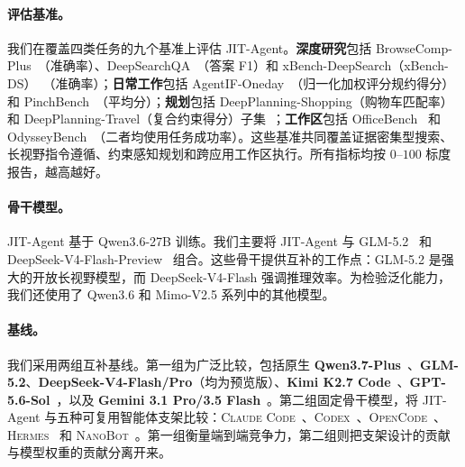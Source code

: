 \documentclass{article}
\newcommand{\ourmethod}{JIT-Agent\xspace}
\begin{document}
\paragraph{评估基准。}
我们在覆盖四类任务的九个基准上评估 \ourmethod。\textbf{深度研究}包括 BrowseComp-Plus~\citep{chen2025browsecompplusfairtransparentevaluation}（准确率）、DeepSearchQA~\citep{gupta2026deepsearchqabridgingcomprehensivenessgap}（答案 F1）和 xBench-DeepSearch（xBench-DS）~\citep{chen2025xbenchtrackingagentsproductivity}（准确率）；\textbf{日常工作}包括 AgentIF-Oneday~\citep{chen2026agentifonedaytasklevelinstructionfollowingbenchmark}（归一化加权评分规约得分）和 PinchBench~\citep{pinchbenchBestModels}（平均分）；\textbf{规划}包括 DeepPlanning-Shopping（购物车匹配率）和 DeepPlanning-Travel（复合约束得分）子集~\citep{zhang2026deepplanningbenchmarkinglonghorizonagentic}；\textbf{工作区}包括 OfficeBench~\citep{wang2024officebenchbenchmarkinglanguageagents} 和 OdysseyBench~\citep{wang2025odysseybenchevaluatingllmagents}（二者均使用任务成功率）。这些基准共同覆盖证据密集型搜索、长视野指令遵循、约束感知规划和跨应用工作区执行。所有指标均按 $0$--$100$ 标度报告，越高越好。

\vspace{-0.5em}
\paragraph{骨干模型。}
\ourmethod 基于 Qwen3.6-27B 训练。我们主要将 \ourmethod 与 {GLM-5.2}~\citep{zai2026glm52} 和 {DeepSeek-V4-Flash-Preview}~\citep{deepseek2026v4} 组合。这些骨干提供互补的工作点：GLM-5.2 是强大的开放长视野模型，而 DeepSeek-V4-Flash 强调推理效率。为检验泛化能力，我们还使用了 Qwen3.6 和 Mimo-V2.5 系列中的其他模型。

\vspace{-0.5em}
\paragraph{基线。}
我们采用两组互补基线。第一组为广泛比较，包括原生 \textbf{Qwen3.7-Plus}~\citep{qwen2026qwen37plus}、\textbf{GLM-5.2}、\textbf{DeepSeek-V4-Flash/Pro}（均为预览版）、\textbf{Kimi K2.7 Code}~\citep{moonshot2026kimik27code}、\textbf{GPT-5.6-Sol}~\citep{openai2026gpt56}，以及 \textbf{Gemini 3.1 Pro/3.5 Flash}~\citep{google2026gemini31pro,google2026gemini35flash}。第二组固定骨干模型，将 \ourmethod 与五种可复用智能体支架比较：\textsc{Claude Code}~\citep{githubGitHubAnthropicsclaudecode}、\textsc{Codex}~\citep{openaiCodexCoding}、\textsc{OpenCode}~\citep{githubGitHubOpencodeaiopencode}、\textsc{Hermes}~\citep{nous2026hermes} 和 \textsc{NanoBot}~\citep{hkuds2026nanobot}。第一组衡量端到端竞争力，第二组则把支架设计的贡献与模型权重的贡献分离开来。
\end{document}

